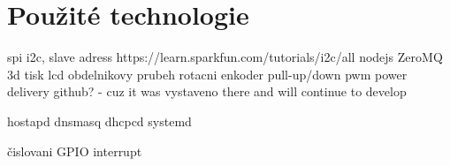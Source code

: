 \chapter{Použité technologie}
spi
i2c, slave adress https://learn.sparkfun.com/tutorials/i2c/all
nodejs
ZeroMQ
3d tisk
lcd
obdelnikovy prubeh
rotacni enkoder
pull-up/down
pwm
power delivery
github? - cuz it was vystaveno there and will continue to develop

hostapd dnsmasq dhcpcd systemd

čislovani GPIO
interrupt